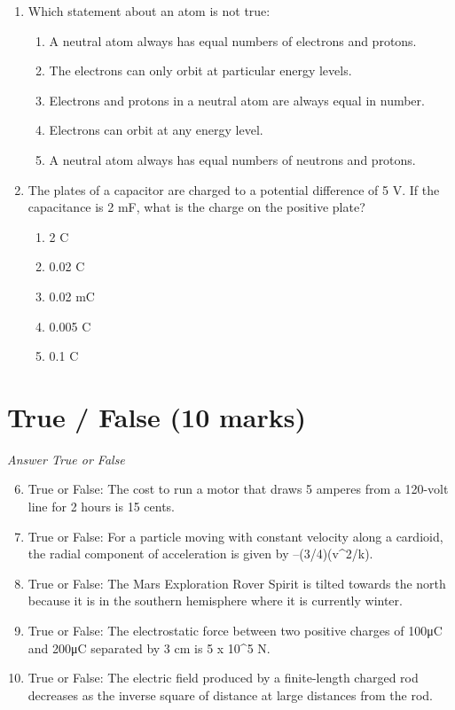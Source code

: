 \documentclass[12pt]{article}
\begin{document}
\begin{enumerate}[label=\arabic*.]
\begin{enumerate}[label=(\alph*)]
    \item $1.5$$10^5 \mathrm{~N} \cdot \mathrm{m}^2 / \mathrm{C}$
\end{enumerate}
\item Which statement about an atom is not true:
\begin{enumerate}[label=(\alph*)]
    \item A neutral atom always has equal numbers of electrons and protons.
    \item The electrons can only orbit at particular energy levels.
    \item Electrons and protons in a neutral atom are always equal in number.
    \item Electrons can orbit at any energy level.
    \item A neutral atom always has equal numbers of neutrons and protons.
\end{enumerate}
\item The plates of a capacitor are charged to a potential difference of 5 V. If the capacitance
is 2 mF, what is the charge on the positive plate?
\begin{enumerate}[label=(\alph*)]
    \item 2 C
    \item 0.02 C
    \item 0.02 mC
    \item 0.005 C
    \item 0.1 C
\end{enumerate}
\end{enumerate}

\section*{True / False (10 marks)}
\textit{Answer True or False}
\begin{enumerate}[label=\arabic*.]
\setcounter{enumi}{5}
\item True or False: The cost to run a motor that draws 5 amperes from a 120-volt line for 2 hours is 15 cents.
\item True or False: For a particle moving with constant velocity along a cardioid, the radial component of acceleration is given by –(3/4)(v\^{}2/k).
\item True or False: The Mars Exploration Rover Spirit is tilted towards the north because it is in the southern hemisphere where it is currently winter.
\item True or False: The electrostatic force between two positive charges of 100μC and 200μC separated by 3 cm is 5 x 10\^{}5 N.
\item True or False: The electric field produced by a finite-length charged rod decreases as the inverse square of distance at large distances from the rod.
\end{enumerate}
\end{document}
